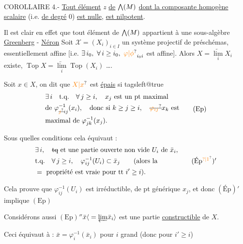 COROLLAIRE 4.- \uline{Tout élément} $z$ \uline{de} $\bigwedge(M)$ \uline{dont la composante homogène scalaire} (i.e. \uline{de degré} 0) \uline{est nulle}, \uline{est nilpotent}.

Il est clair en effet que tout élément de $\bigwedge(M)$ appartient à une sous-algèbre
\hfill\uline{Greenberg} - \uline{Néron}
Soit $\mathscr X=(X_i)_{i\in I}$ un système projectif de préschémas, essentiellement affine [i.e. $\exists\,i_0,\ \forall\,i\geq i_0,\ \unsure{\varphi|\phi}_{i_0i}$ est affine]. Alors $X=\underset{i}{\underleftarrow{\lim}} X_i$ existe, $\operatorname{Top} X=\underset{i}{\underleftarrow{\lim}}\operatorname{Top}(X_i)$ \ldots.

Soit $x\in X$, on dit que $\unsure{X|x}$ est \uline{épais} si
\begingroup\csname tagsleft@true\endcsname
\[
\begin{aligned}
&\exists\,i\quad\text{t.q.}\quad\forall\,j\geq i,\quad x_j\text{ est un pt maximal}\\
&\text{de }\varphi_{\deleted{\unsure{j}}ij}^{-1}(x_i),\quad\text{donc si }k\geq j\geq i,\quad\deleted{\unsure{\varphi_{ij}}}x_k\text{ est}\\
&\text{maximal de }\varphi_{jk}^{-1}(x_j).
\end{aligned}\tag*{(Ep)}
\]

Sous quelles conditions cela équivaut :
\[
\begin{aligned}
&\exists\,i,\quad\deleted{\text{tq}}\ \text{et une partie ouverte non vide }U_i\text{ de }\bar x_i,\\
&\text{t.q.}\quad\forall\,j\geq i,\quad\varphi_{ij}^{-1}(U_i)\subset\bar x_j\qquad\text{(alors la}\\
&{}=\text{ propriété est vraie pour tt }i'\geq i\text{).}
\end{aligned}\tag*{(Ép\textsuperscript{\unsure{?|1}})$'$}
\]

\endgroup
Cela prouve que $\varphi_{ij}^{-1}(U_i)$ est irréductible, de pt générique $x_j$, et donc $(\mathrm{Ép})'$ implique $(\mathrm{Ep})$

Considérons aussi
$(\mathrm{Ep})''$\quad $\bar x\inserted{{}=\underleftarrow{\lim}\bar x_i}$ est une partie \uline{constructible} de $X$.

Ceci équivaut  à : $\bar x=\varphi_i^{-1}(\bar x_i)$ pour $i$ grand  (donc pour $i'\geq i$)

